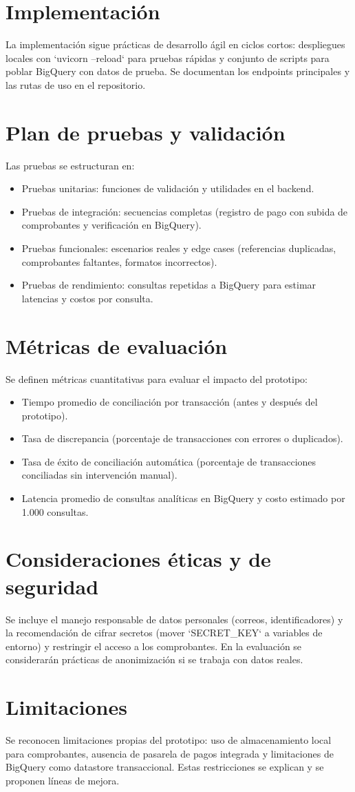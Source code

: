 \section{Implementación}
La implementación sigue prácticas de desarrollo ágil en ciclos cortos: despliegues locales con `uvicorn --reload` para pruebas rápidas y conjunto de scripts para poblar BigQuery con datos de prueba. Se documentan los endpoints principales y las rutas de uso en el repositorio.

\section{Plan de pruebas y validación}
Las pruebas se estructuran en:
\begin{itemize}
	\item Pruebas unitarias: funciones de validación y utilidades en el backend.
	\item Pruebas de integración: secuencias completas (registro de pago con subida de comprobantes y verificación en BigQuery).
	\item Pruebas funcionales: escenarios reales y edge cases (referencias duplicadas, comprobantes faltantes, formatos incorrectos).
	\item Pruebas de rendimiento: consultas repetidas a BigQuery para estimar latencias y costos por consulta.
\end{itemize}

\section{Métricas de evaluación}
Se definen métricas cuantitativas para evaluar el impacto del prototipo:
\begin{itemize}
	\item Tiempo promedio de conciliación por transacción (antes y después del prototipo).
	\item Tasa de discrepancia (porcentaje de transacciones con errores o duplicados).
	\item Tasa de éxito de conciliación automática (porcentaje de transacciones conciliadas sin intervención manual).
	\item Latencia promedio de consultas analíticas en BigQuery y costo estimado por 1.000 consultas.
\end{itemize}

\section{Consideraciones éticas y de seguridad}
Se incluye el manejo responsable de datos personales (correos, identificadores) y la recomendación de cifrar secretos (mover `SECRET_KEY` a variables de entorno) y restringir el acceso a los comprobantes. En la evaluación se considerarán prácticas de anonimización si se trabaja con datos reales.

\section{Limitaciones}
Se reconocen limitaciones propias del prototipo: uso de almacenamiento local para comprobantes, ausencia de pasarela de pagos integrada y limitaciones de BigQuery como datastore transaccional. Estas restricciones se explican y se proponen líneas de mejora.
